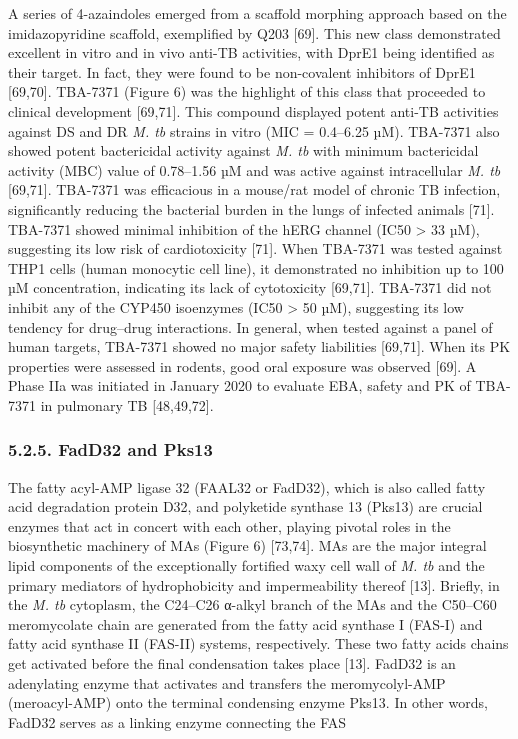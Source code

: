 \documentclass{article}
\begin{document}
A series of 4-azaindoles emerged from a scaffold morphing approach based on the imidazopyridine scaffold, exemplified by Q203 [69]. This new class demonstrated excellent in vitro and in vivo anti-TB activities, with DprE1 being identified as their target. In fact, they were found to be non-covalent inhibitors of DprE1 [69,70]. TBA-7371 (Figure 6) was the highlight of this class that proceeded to clinical development [69,71]. This compound displayed potent anti-TB activities against DS and DR \textit{M. tb} strains in vitro (MIC = 0.4–6.25 µM). TBA-7371 also showed potent bactericidal activity against \textit{M. tb} with minimum bactericidal activity (MBC) value of 0.78–1.56 µM and was active against intracellular \textit{M. tb} [69,71]. TBA-7371 was efficacious in a mouse/rat model of chronic TB infection, significantly reducing the bacterial burden in the lungs of infected animals [71]. TBA-7371 showed minimal inhibition of the hERG channel (IC50 > 33 µM), suggesting its low risk of cardiotoxicity [71]. When TBA-7371 was tested against THP1 cells (human monocytic cell line), it demonstrated no inhibition up to 100 µM concentration, indicating its lack of cytotoxicity [69,71]. TBA-7371 did not inhibit any of the CYP450 isoenzymes (IC50 > 50 µM), suggesting its low tendency for drug–drug interactions. In general, when tested against a panel of human targets, TBA-7371 showed no major safety liabilities [69,71]. When its PK properties were assessed in rodents, good oral exposure was observed [69]. A Phase IIa was initiated in January 2020 to evaluate EBA, safety and PK of TBA-7371 in pulmonary TB [48,49,72].

\subsubsection{5.2.5. FadD32 and Pks13}

The fatty acyl-AMP ligase 32 (FAAL32 or FadD32), which is also called fatty acid degradation protein D32, and polyketide synthase 13 (Pks13) are crucial enzymes that act in concert with each other, playing pivotal roles in the biosynthetic machinery of MAs (Figure 6) [73,74]. MAs are the major integral lipid components of the exceptionally fortified waxy cell wall of \textit{M. tb} and the primary mediators of hydrophobicity and impermeability thereof [13]. Briefly, in the \textit{M. tb} cytoplasm, the C24–C26 α-alkyl branch of the MAs and the C50–C60 meromycolate chain are generated from the fatty acid synthase I (FAS-I) and fatty acid synthase II (FAS-II) systems, respectively. These two fatty acids chains get activated before the final condensation takes place [13]. FadD32 is an adenylating enzyme that activates and transfers the meromycolyl-AMP (meroacyl-AMP) onto the terminal condensing enzyme Pks13. In other words, FadD32 serves as a linking enzyme connecting the FAS
\end{document}
